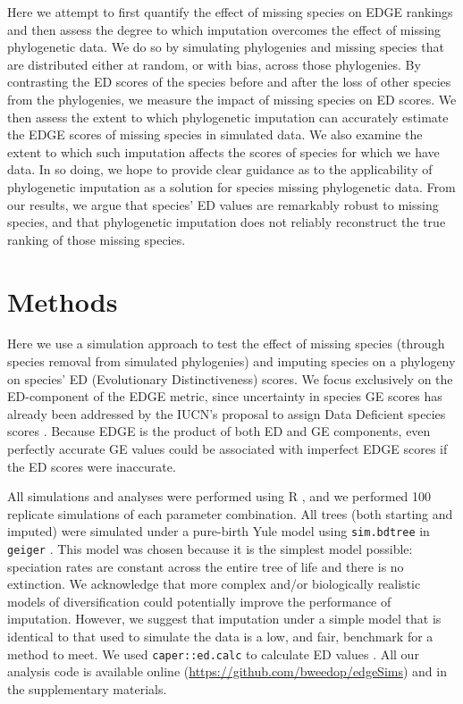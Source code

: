 \documentclass[10pt,english]{article}
\begin{document}
Here we attempt to first quantify the effect of missing species on EDGE rankings
and then assess the degree to which imputation overcomes the effect of missing
phylogenetic data. We do so by simulating phylogenies and missing species that
are distributed either at random, or with bias, across those phylogenies. By
contrasting the ED scores of the species before and after the loss of other
species from the phylogenies, we measure the impact of missing species on ED
scores. We then assess the extent to which phylogenetic imputation can
accurately estimate the EDGE scores of missing species in simulated data. We
also examine the extent to which such imputation affects the scores of species
for which we have data. In so doing, we hope to provide clear guidance as to the
applicability of phylogenetic imputation as a solution for species missing
phylogenetic data. From our results, we argue that species' ED values are
remarkably robust to missing species, and that phylogenetic imputation does not
reliably reconstruct the true ranking of those missing species.

\section*{Methods}

Here we use a simulation approach to test the effect of missing species (through
species removal from simulated phylogenies) and imputing species on a phylogeny
on species' ED (Evolutionary Distinctiveness) scores. We focus exclusively on
the ED-component of the EDGE metric, since uncertainty in species GE scores has
already been addressed by the IUCN's proposal to assign Data Deficient species
scores \autocite{Iucn2001, Iucn2008}. Because EDGE is the product of both ED and
GE components, even perfectly accurate GE values could
be associated with imperfect EDGE scores if the ED scores were inaccurate.


All simulations and analyses were performed using R \autocite[version
3.4.0;][]{R2017}, and we performed 100 replicate simulations of each parameter
combination. All trees (both starting and imputed) were simulated under a
pure-birth Yule model using \texttt{sim.bdtree} in \texttt{geiger}
\autocite[setting parameters \texttt{b=1} and \texttt{d=0};][]{Pennell2014}.
This model was chosen because it is the simplest model possible: speciation
rates are constant across the entire tree of life and there is no extinction. We
acknowledge that more complex and/or biologically realistic models of
diversification could potentially improve the performance of imputation.
However, we suggest that imputation under a simple model that is identical to
that used to simulate the data is a low, and fair, benchmark for a method to
meet. We used \texttt{caper::ed.calc} to calculate ED values
\autocite{Orme2013}. All our analysis code is available online
(\url{https://github.com/bweedop/edgeSims}) and in the supplementary materials.
\end{document}
